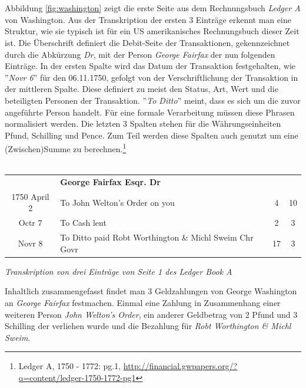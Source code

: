 \documentclass[12pt,a4paper]{article}
\begin{document}
\\
\\
Abbildung \ref{fig:washington} zeigt die erste Seite aus dem Rechnungsbuch \textit{Ledger A} von Washington. Aus der Transkription der ersten 3 Einträge erkennt man eine Struktur, wie sie typisch ist für ein US amerikanisches Rechnungsbuch dieser Zeit ist. Die Überschrift definiert die Debit-Seite der Transaktionen, gekennzeichnet durch die Abkürzung \textit{Dr}, mit der Person \textit{George Fairfax} der nun folgenden Einträge. In der ersten Spalte wird das Datum der Transaktion festgehalten, wie ''\textit{Novr 6}'' für den 06.11.1750, gefolgt von der Verschriftlichung der Transaktion in der mittleren Spalte. Diese definiert zu meist den Status, Art, Wert und die beteiligten Personen der Transaktion. ''\textit{To Ditto}'' meint, dass es sich um die zuvor angeführte Person handelt. Für eine formale Verarbeitung müssen diese Phrasen normalisiert werden. Die letzten 3 Spalten stehen für die Währungseinheiten Pfund, Schilling und Pence. Zum Teil werden diese Spalten auch genutzt um eine (Zwischen)Summe zu berechnen.\footnote{Ledger A, 1750 - 1772: pg.1, \protect\url{http://financial.gwpapers.org/?q=content/ledger-1750-1772-pg1}}
\\
\\
\begin{tabular}{clcc}
& \textbf{George Fairfax Esqr. Dr}\\
1750 April 2 & To John Welton's Order on you & 4 & 10\\
Octr 7 & To Cash lent & 2 & 3 \\
Novr 8 & To Ditto paid Robt Worthington \& Michl Sweim Chr Govr &  17 & 3\\
\end{tabular}
\medskip
\begin{center}
\textit{Transkription von drei Einträge von Seite 1 des Ledger Book A}
\end{center}
Inhaltlich zusammengefasst findet man 3 Geldzahlungen von George Washington an \textit{George Fairfax} festmachen. Einmal eine Zahlung in Zusammenhang einer weiteren Person \textit{John Welton's Order}, ein anderer Geldbetrag von 2 Pfund und 3 Schilling der verliehen wurde und die Bezahlung für \textit{Robt Worthington \& Michl Sweim}.
\end{document}
